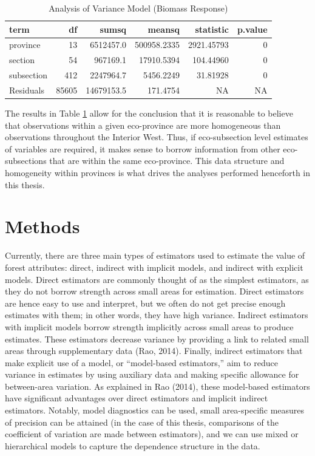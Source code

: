 \documentclass[12pt,twoside]{reedthesis}
\begin{document}
\clearpage
\begin{longtable}[t]{lrrrrr}
\caption{\label{tab:anova}Analysis of Variance Model (Biomass Response)}\\
\toprule
term & df & sumsq & meansq & statistic & p.value\\
\midrule
province & 13 & 6512457.0 & 500958.2335 & 2921.45793 & 0\\
section & 54 & 967169.1 & 17910.5394 & 104.44960 & 0\\
subsection & 412 & 2247964.7 & 5456.2249 & 31.81928 & 0\\
Residuals & 85605 & 14679153.5 & 171.4754 & NA & NA\\
\bottomrule
\end{longtable}
The results in Table \ref{tab:anova} allow for the conclusion that it is reasonable to believe that observations within a given eco-province are more homogeneous than observations throughout the Interior West. Thus, if eco-subsection level estimates of variables are required, it makes sense to borrow information from other eco-subsections that are within the same eco-province. This data structure and homogeneity within provinces is what drives the analyses performed henceforth in this thesis.

\hypertarget{methods}{%
\chapter{Methods}\label{methods}}

Currently, there are three main types of estimators used to estimate the value of forest attributes: direct, indirect with implicit models, and indirect with explicit models. Direct estimators are commonly thought of as the simplest estimators, as they do not borrow strength across small areas for estimation. Direct estimators are hence easy to use and interpret, but we often do not get precise enough estimates with them; in other words, they have high variance. Indirect estimators with implicit models borrow strength implicitly across small areas to produce estimates. These estimators decrease variance by providing a link to related small areas through supplementary data (Rao, 2014). Finally, indirect estimators that make explicit use of a model, or ``model-based estimators,'' aim to reduce variance in estimates by using auxiliary data and making specific allowance for between-area variation. As explained in Rao (2014), these model-based estimators have significant advantages over direct estimators and implicit indirect estimators. Notably, model diagnostics can be used, small area-specific measures of precision can be attained (in the case of this thesis, comparisons of the coefficient of variation are made between estimators), and we can use mixed or hierarchical models to capture the dependence structure in the data.
\end{document}
